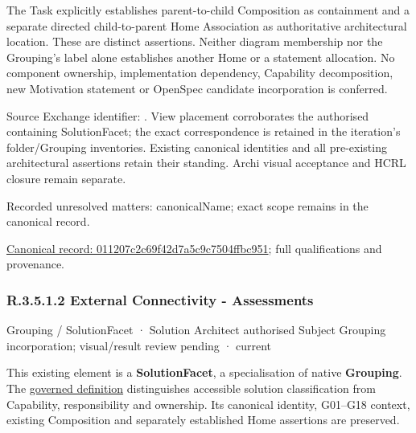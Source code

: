 The Task explicitly establishes parent-to-child Composition as containment and
a separate directed child-to-parent Home Association as authoritative architectural
location. These are distinct assertions. Neither diagram membership nor the
Grouping's label alone establishes another Home or a statement allocation.
No component ownership, implementation dependency, Capability decomposition,
new Motivation statement or OpenSpec candidate incorporation is conferred.



Source Exchange identifier: \texttt{}. View placement corroborates
the authorised containing SolutionFacet; the exact correspondence is retained in the
iteration's folder/Grouping inventories. Existing canonical identities and all
pre-existing architectural assertions retain their standing. Archi visual
acceptance and HCRL closure remain separate.


{\small Recorded unresolved matters: canonicalName; exact scope remains in the canonical record.}\par
{\footnotesize \href{../../../../../../../continuum/grouping/011207c2c69f42d7a5c9c7504ffbc951.md}{Canonical record: 011207c2c69f42d7a5c9c7504ffbc951}; full qualifications and provenance.}\par
\subsubsection*{R.3.5.1.2 External Connectivity - Assessments}
\label{navigation:R.3.5.1.2}

\label{element:4cc994e1de714cc8915dc965d2694808}
{\small Grouping / SolutionFacet · Solution Architect authorised Subject Grouping incorporation; visual/result review pending · current}\par

This existing element is a \textbf{SolutionFacet}, a specialisation of native
\textbf{Grouping}. The \href{\detokenize{../../../../../../../governance/continuum-representation.md#solutionfacet-classification--1119-candidate}}{governed definition}
distinguishes accessible solution classification from Capability, responsibility
and ownership. Its canonical identity, G01–G18 context, existing Composition
and separately established Home assertions are preserved.



